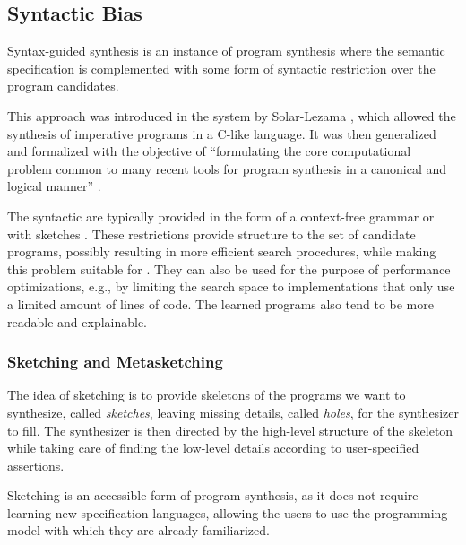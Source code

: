 \subsection{Syntactic Bias}
\label{sec:syntactic-bias}

Syntax-guided synthesis is an instance of program synthesis where the semantic
specification is complemented with some form of syntactic restriction over the
program candidates.

This approach was introduced in the  system by Solar-Lezama \cite{Solar-Lezama:2008}, which allowed the
synthesis of imperative programs in a C-like language.
It was then generalized and formalized with the objective of ``formulating the
core computational problem common to many recent tools for program synthesis in
a canonical and logical manner'' \cite{Alur:sygus:2013}.

The syntactic  are typically provided
in the form of a context-free grammar \cite{Alur:sygus:2013} or with sketches
\cite{Solar-Lezama:2008}. These restrictions provide structure to the set of
candidate programs, possibly resulting in more efficient search procedures,
while making this problem suitable for  \cite{Alur:sygus:2013}. They can also be used for
the purpose of performance optimizations, e.g., by limiting the search space to
implementations that only use a limited amount of lines of code. The learned
programs also tend to be more readable and explainable.

\subsubsection{Sketching and Metasketching}
\label{sec:sketching}

The idea of sketching is to provide skeletons of the programs we want to
synthesize, called \textit{sketches}, leaving missing details, called
\textit{holes}, for the synthesizer to fill.
The synthesizer is then directed by the high-level structure of the skeleton
while taking care of finding the low-level details according to user-specified
assertions.

Sketching is an accessible form of program synthesis, as it does not require
learning new specification languages, allowing the users to use the programming
model with which they are already familiarized.

